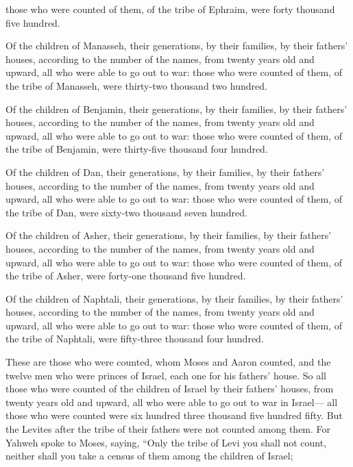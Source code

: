 {those who were counted of them, of the tribe of Ephraim, were forty thousand five hundred.
\par }{\PP {}Of the children of Manasseh, their generations, by their families, by their fathers’ houses, according to the number of the names, from twenty years old and upward, all who were able to go out to war:
those who were counted of them, of the tribe of Manasseh, were thirty-two thousand two hundred.
\par }{\PP {}Of the children of Benjamin, their generations, by their families, by their fathers’ houses, according to the number of the names, from twenty years old and upward, all who were able to go out to war:
those who were counted of them, of the tribe of Benjamin, were thirty-five thousand four hundred.
\par }{\PP {}Of the children of Dan, their generations, by their families, by their fathers’ houses, according to the number of the names, from twenty years old and upward, all who were able to go out to war:
those who were counted of them, of the tribe of Dan, were sixty-two thousand seven hundred.
\par }{\PP {}Of the children of Asher, their generations, by their families, by their fathers’ houses, according to the number of the names, from twenty years old and upward, all who were able to go out to war:
those who were counted of them, of the tribe of Asher, were forty-one thousand five hundred.
\par }{\PP {}Of the children of Naphtali, their generations, by their families, by their fathers’ houses, according to the number of the names, from twenty years old and upward, all who were able to go out to war:
those who were counted of them, of the tribe of Naphtali, were fifty-three thousand four hundred.
\par }{\PP {}These are those who were counted, whom Moses and Aaron counted, and the twelve men who were princes of Israel, each one for his fathers’ house.
So all those who were counted of the children of Israel by their fathers’ houses, from twenty years old and upward, all who were able to go out to war in Israel—
all those who were counted were six hundred three thousand five hundred fifty.
But the Levites after the tribe of their fathers were not counted among them.
For Yahweh spoke to Moses, saying,
“Only the tribe of Levi you shall not count, neither shall you take a census of them among the children of Israel;
}

